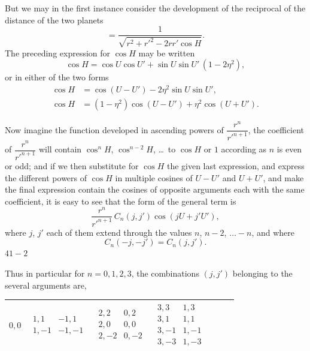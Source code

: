 \documentclass[12pt,a4paper]{article}
\theoremstyle{plain}
\begin{document}
But we may in the first instance consider the development of the reciprocal of the distance of the two planets
\[
=\frac{1}{\sqrt{r^{2}+r'^{2}-2rr'\cos H}}.
\]
The preceding expression for $\cos H$ may be written
\[
\cos H=\cos U\cos U'+\sin U\sin U'\,(1-2\eta^{2}),
\]
or in either of the two forms
\begin{align*}
\cos H &= \cos(U-U')-2\eta^{2}\sin U\sin U',\\
\cos H &= (1-\eta^{2})\cos(U-U')+\eta^{2}\cos(U+U').
\end{align*}

Now imagine the function developed in ascending powers of $\dfrac{r^{n}}{r'^{n+1}}$, the coefficient of $\dfrac{r^{n}}{r'^{n+1}}$ will contain $\cos^{n} H$, $\cos^{n-2} H$, \ldots\ to $\cos H$ or $1$ according as $n$ is even or odd; and if we then substitute for $\cos H$ the given last expression, and express the different powers of $\cos H$ in multiple cosines of $U-U'$ and $U+U'$, and make the final expression contain the cosines of opposite arguments each with the same coefficient, it is easy to see that the form of the general term is
\[
\frac{r^{n}}{r'^{n+1}}\,C_{n}(j,j')\cos(jU+j'U'),
\]
where $j$, $j'$ each of them extend through the values $n$, $n-2$, $\ldots-n$, and where
\[
C_{n}(-j,-j')=C_{n}(j,j').
\]
\hfill $41-2$

\newpage
{} Thus in particular for $n=0,1,2,3$, the combinations $(j,j')$ belonging to the several arguments are,

\begin{center}
\small
\setlength{\tabcolsep}{4pt}
\begin{tabular}{|c|c|c|c|c|c|c|}
\hline
$0,0$ &
$\begin{array}{cc}1,1 & -1,1\\ 1,-1 & -1,-1\end{array}$ &
$\begin{array}{cc}2,2 & 0,2\\ 2,0 & 0,0\\ 2,-2 & 0,-2\end{array}$ &
$\begin{array}{cc}3,3 & 1,3\\ 3,1 & 1,1\\ 3,-1 & 1,-1\\ 3,-3 & 1,-3\end{array}$ \\
\hline
\end{tabular}
\end{center}
\end{document}
